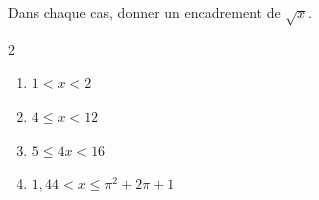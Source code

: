 \begin{exo}{}
	Dans chaque cas, donner un encadrement de $\sqrt{x}$.
	\vspace*{-2mm}
	\begin{multicols}{2}
	\begin{enumerate}[itemsep=2mm]
		\item $1 < x < 2$
		\item $4 \le x < 12$
		\item $5 \le 4x < 16$
		\item $1,44 < x \le \pi^2 + 2\pi + 1$
	\end{enumerate}
	\end{multicols}\vspace*{-2mm}
\end{exo}
